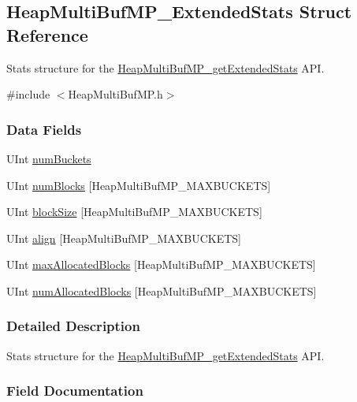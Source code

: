 \subsection{HeapMultiBufMP\_\-ExtendedStats Struct Reference}
\label{struct_heap_multi_buf_m_p___extended_stats}


Stats structure for the \hyperlink{_heap_multi_buf_m_p_8h_a386420101752537b59e12520aafd9b0d}{HeapMultiBufMP\_\-getExtendedStats} API.  




{\ttfamily \#include $<$HeapMultiBufMP.h$>$}

\subsubsection*{Data Fields}
\begin{DoxyCompactItemize}
\item 
UInt \hyperlink{struct_heap_multi_buf_m_p___extended_stats_a67a4abac5bfe360b37989a60d4a4cfb4}{numBuckets}
\item 
UInt \hyperlink{struct_heap_multi_buf_m_p___extended_stats_a084ca66b6b093779c105a1846eae6bd4}{numBlocks} \mbox{[}HeapMultiBufMP\_\-MAXBUCKETS\mbox{]}
\item 
UInt \hyperlink{struct_heap_multi_buf_m_p___extended_stats_a2477f91b9b48ec54b5f14f5c808e1678}{blockSize} \mbox{[}HeapMultiBufMP\_\-MAXBUCKETS\mbox{]}
\item 
UInt \hyperlink{struct_heap_multi_buf_m_p___extended_stats_a6ba215fe07dc8a00e8eb8cf75cf1d81c}{align} \mbox{[}HeapMultiBufMP\_\-MAXBUCKETS\mbox{]}
\item 
UInt \hyperlink{struct_heap_multi_buf_m_p___extended_stats_af3ef9e5df01faaffdead0223f75b9884}{maxAllocatedBlocks} \mbox{[}HeapMultiBufMP\_\-MAXBUCKETS\mbox{]}
\item 
UInt \hyperlink{struct_heap_multi_buf_m_p___extended_stats_a6e1fab6694ccbea899c34a9c11e207e4}{numAllocatedBlocks} \mbox{[}HeapMultiBufMP\_\-MAXBUCKETS\mbox{]}
\end{DoxyCompactItemize}


\subsubsection{Detailed Description}
Stats structure for the \hyperlink{_heap_multi_buf_m_p_8h_a386420101752537b59e12520aafd9b0d}{HeapMultiBufMP\_\-getExtendedStats} API. 

\subsubsection{Field Documentation}
